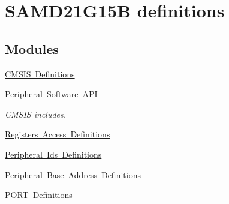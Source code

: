 \hypertarget{group___s_a_m_d21_g15_b__definitions}{}\section{S\+A\+M\+D21\+G15B definitions}
\label{group___s_a_m_d21_g15_b__definitions}
\subsection*{Modules}
\begin{DoxyCompactItemize}
\item 
\mbox{\hyperlink{group___s_a_m_d21_g15_b__cmsis}{C\+M\+S\+I\+S Definitions}}
\item 
\mbox{\hyperlink{group___s_a_m_d21_g15_b__api}{Peripheral Software A\+PI}}
\begin{DoxyCompactList}\small\item\em C\+M\+S\+IS includes. \end{DoxyCompactList}\item 
\mbox{\hyperlink{group___s_a_m_d21_g15_b__reg}{Registers Access Definitions}}
\item 
\mbox{\hyperlink{group___s_a_m_d21_g15_b__id}{Peripheral Ids Definitions}}
\item 
\mbox{\hyperlink{group___s_a_m_d21_g15_b__base}{Peripheral Base Address Definitions}}
\item 
\mbox{\hyperlink{group___s_a_m_d21_g15_b__port}{P\+O\+R\+T Definitions}}
\end{DoxyCompactItemize}
